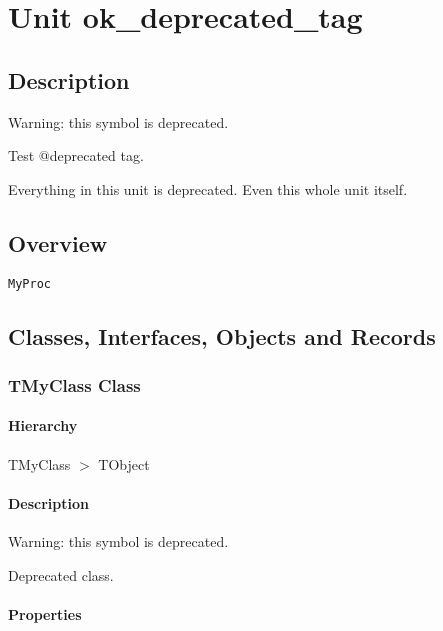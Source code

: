 \documentclass{report}
\begin{document}
\chapter{Unit ok{\_}deprecated{\_}tag}
\section{Description}
Warning: this symbol is deprecated.

Test @deprecated tag.\hfill\vspace*{1ex}



Everything in this unit is deprecated. Even this whole unit itself.


\section{Overview}
\begin{description}
\item[\texttt{\begin{ttfamily}TMyClass\end{ttfamily} Class}]
\end{description}
\begin{description}
\item[\texttt{MyProc}]
\end{description}
\section{Classes, Interfaces, Objects and Records}
\subsection*{TMyClass Class}
\subsubsection*{\large{\textbf{Hierarchy}}\normalsize\hspace{1ex}\hfill}
TMyClass {$>$} TObject
\subsubsection*{\large{\textbf{Description}}\normalsize\hspace{1ex}\hfill}
Warning: this symbol is deprecated.

 Deprecated class.\subsubsection*{\large{\textbf{Properties}}\normalsize\hspace{1ex}\hfill}
\end{document}
